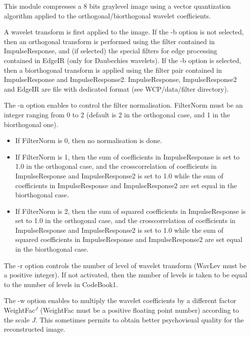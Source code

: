 This module compresses a 8 bits graylevel image using a vector quantization 
algorithm applied to the orthogonal/biorthogonal 
wavelet coefficients. 

A wavelet transform is first applied to the image. If the -b option 
is not selected, then an orthogonal transform is performed using the 
filter contained in ImpulseResponse, and (if selected) the special 
filters for edge processing contained in EdgeIR (only for Daubechies 
wavelets). If the -b option is selected, then a biorthogonal transform 
is applied using the filter pair contained in ImpulseResponse 
and ImpulseResponse2. ImpulseResponse, ImpulseResponse2 and EdgeIR 
are file with dedicated format (see WCP/data/filter directory). 

The -n option enables to control the filter normalisation. FilterNorm 
must be an integer ranging from 0 to 2 (default is 2 in the orthogonal case, 
and 1 in the biorthogonal one). 
\begin{itemize} 
\item 
If FilterNorm is 0, then no normalisation is done.
\item 
If FilterNorm is 1, then the sum of coefficients in ImpulseResponse 
is set to 1.0 in the orthogonal case, and the crosscorrelation of 
coefficients in ImpulseResponse and ImpulseResponse2 is set to 1.0 
while the sum of coefficients in ImpulseResponse and ImpulseResponse2 
are set equal in the biorthogonal case. 
\item
If FilterNorm is 2, then the sum of squared coefficients in ImpulseResponse 
is set to 1.0 in the orthogonal case, and the crosscorrelation of 
coefficients in ImpulseResponse and ImpulseResponse2 is set to 1.0 
while the sum of squared coefficients in ImpulseResponse and ImpulseResponse2 
are set equal in the biorthogonal case. 
\end{itemize}

The -r option controls the number of level of wavelet transform (WavLev 
must be a positive integer). If not activated, then the number of levels 
is taken to be equal to the number of levels in CodeBook1. 

The -w option enables to multiply the wavelet coefficients by a different 
factor WeightFac$^J$ (WeightFac must be a positive floating point number) 
according to the scale $J$. This sometimes permits to obtain better 
psychovisual quality for the reconstructed image. 

